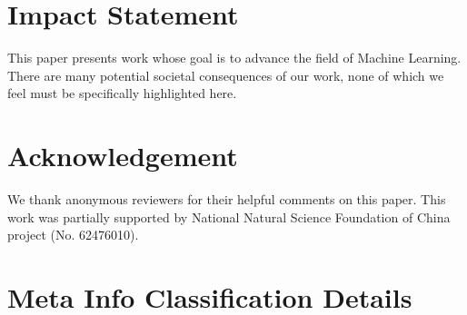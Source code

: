 \documentclass{article}
\theoremstyle{plain}
\theoremstyle{definition}
\theoremstyle{remark}
\begin{document}
\section*{Impact Statement}
This paper presents work whose goal is to advance the field of Machine Learning. There are many potential societal consequences of our work, none of which we feel must be specifically highlighted here.

\section*{Acknowledgement}
We thank anonymous reviewers for their helpful comments on this paper. This work was partially supported by National Natural Science Foundation of China project (No. 62476010).  








\newpage
\appendix
\onecolumn
\section{Meta Info Classification Details}
\label{sec: metadata classification}
\end{document}
